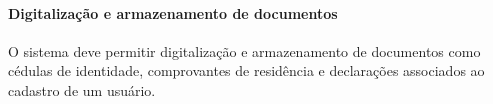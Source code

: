\documentclass[12pt,a4paper]{report}
\begin{document}
\paragraph{Digitalização e armazenamento de documentos} O sistema deve permitir digitalização e armazenamento de documentos como cédulas de identidade, comprovantes de residência e declarações associados ao cadastro de um usuário.


\end{document}
